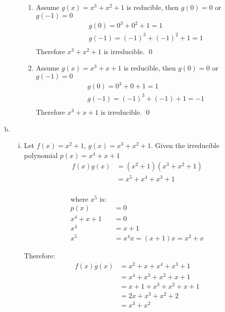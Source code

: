 \documentclass[11pt]{article}
\theoremstyle{definition}
\begin{document}
\begin{enumerate}[a.]
\begin{enumerate}[i. ]
        \begin{enumerate}
          \item
            Assume $g(x) = x^3 + x^2 + 1$ is reducible, then $g(0) = 0$ or $g(-1) = 0$
            \begin{align*}
              & g(0) = 0^3 + 0^2 + 1 = 1\\
              & g(-1) = (-1)^3 + (-1)^2 + 1 = 1\\
            \end{align*}
            Therefore $x^3 + x^2 + 1$ is irreducible. \qed

          \item
            Assume $g(x) = x^3 + x + 1$ is reducible, then $g(0) = 0$ or $g(-1) = 0$
            \begin{align*}
              & g(0) = 0^3 + 0 + 1 = 1 \\
              & g(-1) = (-1)^3 + (-1) + 1 = -1 \\
            \end{align*}
            Therefore $x^3 + x + 1$ is irreducible. \qed
        \end{enumerate}

    \end{enumerate}
  \item
    \begin{enumerate}[i. ]
      \item
        Let $f(x) = x^2 + 1$, $g(x) = x^3 + x^2 + 1$. Given the irreducible polynomial $p(x) = x^4 + x + 1$
        \begin{align*}
          f(x)g(x) &= (x^2 + 1)(x^3 + x^2 + 1)   \\
                  &= x^5 + x^4 + x^3 + 1 \\
        \end{align*}

        \begin{align*}
          \text{where } x^5 \text{ is: } \\
          p(x) &= 0 \\
          x^4 + x + 1 &= 0 \\
          x^4 &= x + 1 \\
          x^5 &= x^4x = (x + 1)x = x^2 + x
        \end{align*}

        Therefore:
        \begin{align*}
          f(x)g(x) &= x^2 + x + x^4 + x^3 + 1 \\
                   &= x^4 + x^3 + x^2 + x + 1 \\
                   &= x + 1 + x^ 3 + x^2 + x + 1 \\
                   &= 2x + x^3 + x^2 + 2 \\
                   &= x^3 + x^2
        \end{align*}


\end{enumerate}
\end{enumerate}
\end{document}

